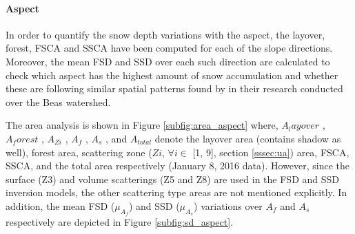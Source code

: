 \documentclass[review]{elsarticle}
\numberwithin{equation}{section}
\numberwithin{figure}{section}
\numberwithin{table}{section}
\begin{document}
\paragraph*{Aspect}

In order to quantify the snow depth variations with the aspect, the layover, forest, FSCA and SSCA have been computed for each of the slope directions. Moreover, the mean FSD and SSD over each such direction are calculated to check which aspect has the highest amount of snow accumulation and whether these are following similar spatial patterns found by \cite{Jain2009} in their research conducted over the Beas watershed.

The area analysis is shown in Figure \ref{subfig:area_aspect} where, $A_layover$ , $A_forest$ , $A_{Zi}$ , $A_f$ , $A_ s$ , and $A_{total}$ denote the layover area (contains shadow as well), forest area, scattering zone ($Zi$, $\forall i \in$ [1, 9], section \ref{sssec:ua}) area, FSCA, SSCA, and the total area respectively (January 8, 2016 data). However, since the surface (Z3) and volume scatterings (Z5 and Z8) are used in the FSD and SSD inversion models, the other scattering type areas are not mentioned explicitly. In addition, the mean FSD ($\mu_{A_f}$) and SSD ($\mu_{A_s}$) variations over $A_f$ and $A_s$ respectively are depicted in Figure \ref{subfig:sd_aspect}.
\end{document}
